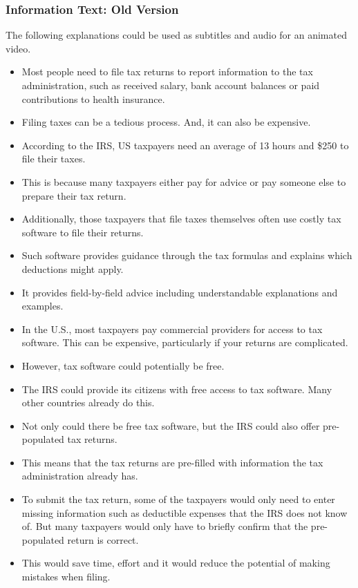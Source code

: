 \documentclass[11pt]{article}
\begin{document}
\subsubsection*{Information Text: Old Version}
The following explanations could be used as subtitles and audio for an animated video.
\begin{itemize}
    \item Most people need to file tax returns to report information to the tax administration, such as received salary, bank account balances or paid contributions to health insurance.
    \item Filing taxes can be a tedious process. And, it can also be expensive.
    \item According to the IRS, US taxpayers need an average of 13 hours and \$250 to file their taxes. 
    \item This is because many taxpayers either pay for advice or pay someone else to prepare their tax return.
    \item Additionally, those taxpayers that file taxes themselves often use costly tax software to file their returns.
    \item Such software provides guidance through the tax formulas and explains which deductions might apply.
    \item It provides field-by-field advice including understandable explanations and examples. 
    \item In the U.S., most taxpayers pay commercial providers for access to tax software. This can be expensive, particularly if your returns are complicated.
    \item However, tax software could potentially be free.
    \item The IRS could provide its citizens with free access to tax software. Many other countries already do this.
    \item Not only could there be free tax software, but the IRS could also offer pre-populated tax returns. 
    \item This means that the tax returns are pre-filled with information the tax administration already has.
    \item To submit the tax return, some of the taxpayers would only need to enter missing information such as deductible expenses that the IRS does not know of. But many taxpayers would only have to briefly confirm that the pre-populated return is correct.
    \item This would save time, effort and it would reduce the potential of making mistakes when filing. 

\end{itemize}
\end{document}

